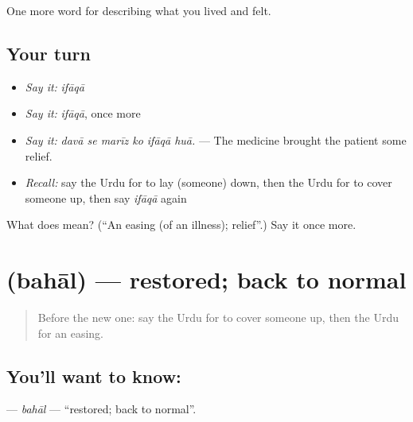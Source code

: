 \begin{grammarlens}[title={What you've built}]
One more word for describing what you lived and felt.
\end{grammarlens}

\subsection*{Your turn}
\begin{itemize}
\raggedright
  \item \emph{Say it:} \emph{ifāqā}
  \item \emph{Say it:} \emph{ifāqā}, once more
  \item \emph{Say it:} \emph{davā se marīz ko ifāqā huā.} — The medicine brought the patient some relief.
  \item \emph{Recall:} say the Urdu for to lay (someone) down, then the Urdu for to cover someone up, then say \emph{ifāqā} again
\end{itemize}

\begin{tcolorbox}[breakable,colback=teal!4,colframe=teal!35!black,title={Before you move on}]
What does  mean? (\textquotedblleft{}An easing (of an illness); relief\textquotedblright{}.) Say it once more.
\end{tcolorbox}
\section[\texorpdfstring{\ur{بحال} (bahāl)}{بحال (bahāl)}]{ (bahāl) — restored; back to normal}

\label{lesson:UR-C481-bahal}



\begin{quote}
Before the new one: say the Urdu for to cover someone up, then the Urdu for an easing.
\end{quote}

\subsection*{You'll want to know: }
\textbf{} — \emph{bahāl} — \textquotedblleft{}restored; back to normal\textquotedblright{}.

\begin{quote}
        
\end{quote}

